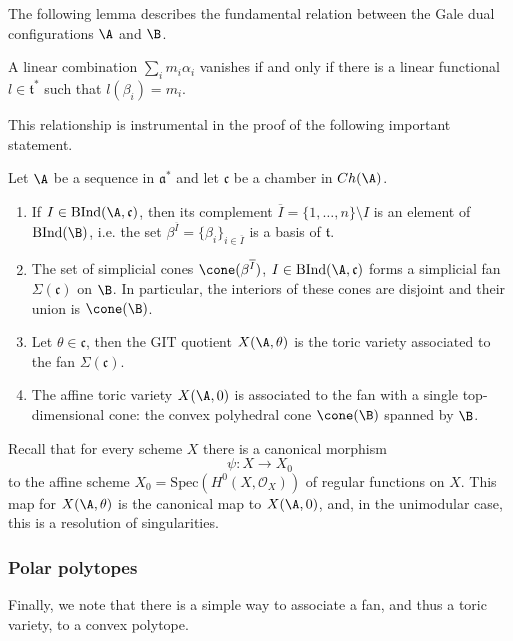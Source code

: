 The following lemma describes the fundamental relation between the Gale dual configurations $\A$ and $\B$. 
\begin{lemma}\label{Galebas}
A linear combination $\sum_i m_i\alpha_i$ vanishes if and only if there is a linear functional $l\in\mathfrak{t}^*$ such that $l(\beta_i)=m_i$.
\end{lemma}
This relationship is instrumental in the proof of the following important statement.
\begin{prop}\label{fanforGIT}
Let $\A$ be a sequence in $\mathfrak{a}^*$ and let $\mathfrak{c}$ be a chamber in $Ch(\A)$. 
\begin{enumerate}%
\item 
 If $I\in \mathrm{BInd}(\A, \mathfrak{c})$, then its complement 
 $\overline{I}=\{1, \ldots ,n\}\setminus I$ is an element of $\mathrm{BInd}(\B)$, 
 i.e.  the set $\beta^{\overline{I}}=\{\beta_i\}_{i\in\overline{I}}$ is a basis 
 of $\mathfrak{t}$.
 \item The set of simplicial cones $\cone(\beta^{\overline{I}})$, $I\in 
 \mathrm{BInd}(\A, \mathfrak{c})$ forms a simplicial fan  
 $\Sigma(\mathfrak{c})$  on $\B$. In particular, the interiors of these cones 
 are disjoint and their union is $ \cone(\B) $. 
\item  Let $\theta\in \mathfrak{c}$, then the GIT quotient $X(\A,\theta)$ is the toric variety associated to the fan $\Sigma(\mathfrak{c})$.
\item The affine toric variety $X(\A,0)$ is associated to the fan with a single top-dimensional cone: 
 the convex polyhedral cone $\cone({\B})$ spanned by $\B$.
\end{enumerate}
\end{prop}



\begin{rema}\label{canonocalmor} Recall that for every scheme $X$ there 
is a canonical morphism
$$\psi: X\to X_0$$ 
to the affine scheme $X_0 = \mathrm{Spec}(H^0(X,\mathcal{O}_X))$ of regular 
functions on $X$. This map for $X(\A,\theta)$ is the canonical map to 
$X(\A,0)$, and, in the unimodular case, this is a resolution of singularities.
\end{rema}


\subsubsection{Polar polytopes}\label{S2.3}


Finally, we note that there is a simple way to associate a fan, and thus a  
toric variety, to a convex polytope. 

